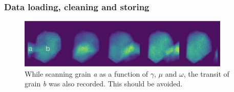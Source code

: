 \documentclass[11pt]{scrartcl}
\begin{document}
\subsubsection{Data loading, cleaning and storing}

\begin{figure}[h]
    \centering
    \includegraphics[width=0.9\textwidth]{grain_transit}
    \caption{While scanning grain {\emph{a}} as a function of $\gamma$, $\mu$ and $\omega$, the transit of grain {\emph{b}} was also recorded. This should be avoided.}
    \label{fig:grain_transit}
\end{figure}
\end{document}
